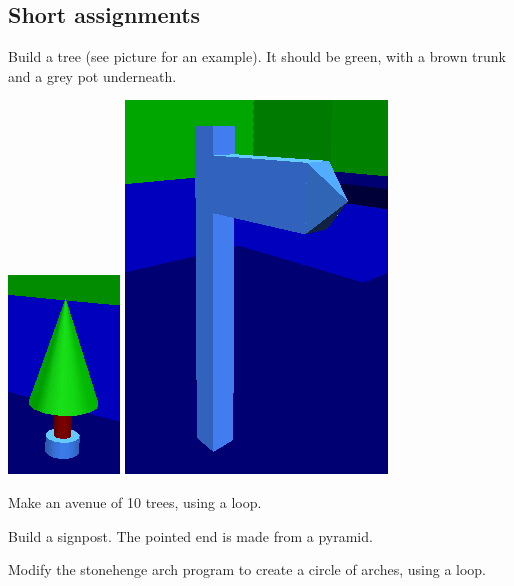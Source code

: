 \documentclass[12pt,a4paper,twoside]{article}
\renewcommand{\_}{\texttt{\symbol{95}}}
\begin{document}
\subsection{Short assignments}

\begin{numericlist}
\item Build a tree (see picture for an example). It should be
      green, with a brown trunk and a grey pot underneath.\\
		\begin{center}
      \includegraphics[scale=0.75,angle=0]{screenshots/3d/tree}\hspace{1cm}
      \includegraphics[scale=0.4,angle=0]{screenshots/3d/signpost}
		\end{center}
\item Make an avenue of 10 trees, using a loop.
\item Build a signpost. The pointed end is made from a pyramid.
\item Modify the stonehenge arch program to create a circle of
      arches, using a loop.\\

\end{numericlist}
\end{document}
